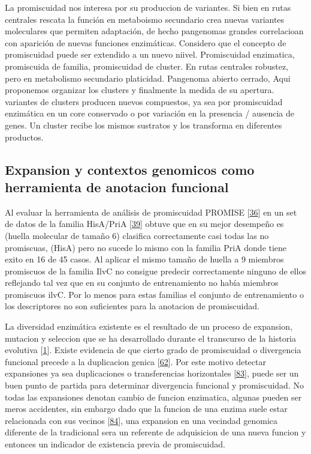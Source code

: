 \documentclass[12pt,twoside]{reedthesis}
\begin{document}
  La promiscuidad nos interesa por su produccion de variantes. Si bien en
  rutas centrales rescata la función en metaboismo secundario crea nuevas
  variantes moleculares que permiten adaptación, de hecho pangenomas
  grandes correlacioan con aparición de nuevas funciones enzimáticas.
  Considero que el concepto de promiscuidad puede ser extendido a un nuevo
  niivel. Promiscuidad enzimatica, promiscuida de familia, promiscuidad de
  cluster. En rutas centrales robustez, pero en metabolismo secundario
  platicidad. Pangenoma abierto cerrado, Aqui proponemos organizar los
  clusters y finalmente la medida de su apertura. variantes de clusters
  producen nuevos compuestos, ya sea por promiscuidad enzimática en un
  core conservado o por variación en la presencia / ausencia de genes. Un
  cluster recibe los mismos sustratos y los transforma en diferentes
  productos.
  
  \subsection{Expansion y contextos genomicos como herramienta de
  anotacion
  funcional}\label{expansion-y-contextos-genomicos-como-herramienta-de-anotacion-funcional}
  
  Al evaluar la herramienta de análisis de promiscuidad PROMISE
  {[}\protect\hyperlink{ref-carbonell_molecular_2010}{36}{]} en un set de
  datos de la familia HisA/PriA
  {[}\protect\hyperlink{ref-noda-garcia_insights_2015}{39}{]} obtuve que
  en su mejor desempeño es (huella molecular de tamaño 6) clasifica
  correctamente casi todas las no promiscuas, (HisA) pero no sucede lo
  mismo con la familia PriA donde tiene exito en 16 de 45 casos. Al
  aplicar el mismo tamaño de huella a 9 miembros promiscuos de la familia
  IlvC no consigue predecir correctamente ninguno de ellos reflejando tal
  vez que en su conjunto de entrenamiento no había miembros promiscuos
  ilvC. Por lo menos para estas familias el conjunto de entrenamiento o
  los descriptores no son suficientes para la anotacion de promiscuidad.
  
  La diversidad enzimática existente es el resultado de un proceso de
  expansion, mutacion y seleccion que se ha desarrollado durante el
  transcurso de la historia evolutiva
  {[}\protect\hyperlink{ref-khersonsky_enzyme_2010}{1}{]}. Existe
  evidencia de que cierto grado de promiscuidad o divergencia funcional
  precede a la duplicacion genica
  {[}\protect\hyperlink{ref-hughes_evolution_1994}{62}{]}. Por este motivo
  detectar expansiones ya sea duplicaciones o transferencias horizontales
  {[}\protect\hyperlink{ref-treangen_horizontal_2011}{83}{]}, puede ser un
  buen punto de partida para determinar divergencia funcional y
  promiscuidad. No todas las expansiones denotan cambio de funcion
  enzimatica, algunas pueden ser meros accidentes, sin embargo dado que la
  funcion de una enzima suele estar relacionada con sus vecinos
  {[}\protect\hyperlink{ref-overbeek_use_1999}{84}{]}, una expansion en
  una vecindad genomica diferente de la tradicional sera un referente de
  adquisicion de una nueva funcion y entonces un indicador de existencia
  previa de promiscuidad.
  
\end{document}

